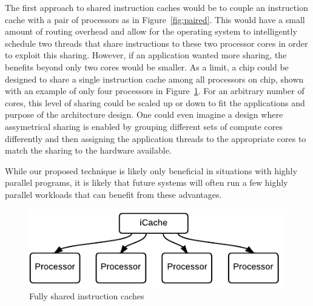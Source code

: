 The first approach to shared instruction caches would be to couple an
instruction cache with a pair of processors as in
Figure~\ref{fig:paired}. 
This would have a small amount of routing overhead and allow for the
operating system to intelligently schedule two threads that share
instructions to these two processor cores in order to exploit this
sharing. 
However, if an application wanted more sharing, the benefits beyond
only two cores would be smaller.
As a limit, a chip could be designed to share a single instruction
cache among all processors on chip, shown with an example of only four
processors in Figure~\ref{fig:shared}.
For an arbitrary number of cores, this level of sharing could be
scaled up or down to fit the applications and purpose of the
architecture design.
One could even imagine a design where assymetrical sharing is enabled
by grouping different sets of compute cores differently and then
assigning the application threads to the appropriate cores to match
the sharing to the hardware available.

While our proposed technique is likely only beneficial in situations
with highly parallel programs, it is likely that future systems will
often run a few highly parallel workloads that can benefit from these
advantages. 

 


\begin{figure}[ht!]
\centering
\includegraphics[width=\columnwidth]{graphics/SharedCaches}
\caption{Fully shared instruction caches}
\label{fig:shared}
\end{figure}



